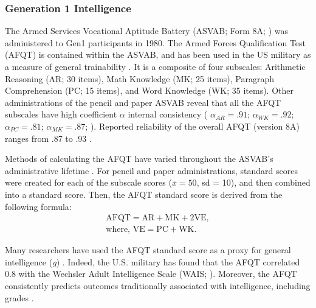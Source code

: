 \subsubsection{Generation 1 Intelligence}
The Armed Services Vocational Aptitude Battery (ASVAB; Form 8A; \citealp{Palmer1988}) was administered to Gen1 participants in 1980. The Armed Forces Qualification Test (AFQT) is contained within the ASVAB, and has been used in the US military as a measure of general trainability \citep{maier1986asvab}. It is a composite of four subscales: Arithmetic Reasoning (AR; 30 items), Math Knowledge (MK; 25 items), Paragraph Comprehension (PC; 15 items), and Word Knowledge (WK; 35 items). Other administrations of the pencil and paper ASVAB reveal that all the AFQT subscales have high coefficient $\alpha$ internal consistency ( $\alpha_{AR} = .91$; $\alpha_{WK} = .92$; $\alpha_{PC} = .81$; $\alpha_{MK} = .87$; \citealp{kass1982}). Reported reliability of the overall AFQT (version 8A) ranges from .87 to .93 \citep{Palmer1988}.

Methods of calculating the AFQT have varied throughout the ASVAB's administrative lifetime \citep{mayberry1992computing}. For pencil and paper administrations, standard scores were created for each of the subscale scores ($\bar{x}=50$, sd = 10), and then combined into a standard score. Then, the AFQT standard score is derived from the following formula:\begin{align}\text{AFQT} = \text{AR} + \text{MK} + 2\text{VE}, \\\text{where, VE} = \text{PC} + \text{WK.}\end{align}

Many researchers have used the AFQT standard score as a proxy for general intelligence (\textit{g}) \citep{herrnstein1994bell,Der2009}. Indeed, the U.S. military has found that the AFQT correlated 0.8 with the Wechsler Adult Intelligence Scale (WAIS; \citealp{mcgrevy1974relationships}). Moreover, the AFQT consistently predicts outcomes traditionally associated with intelligence\citep{Welsh1990}, including grades \citep{wilbourn1984,mathews1977analysis}.

